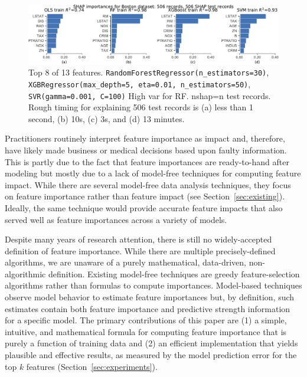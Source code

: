 \documentclass[twoside,11pt]{article}
\newcommand{\secref}[1]{Section~\ref{#1}}
\newcommand{\todo}[1]{{{\color{red}{[#1]}}}}
\begin{document}
\begin{figure}[htbp]
\begin{center}
\includegraphics[scale=0.6]{images/diff-models.pdf}
\caption{Top 8 of 13 features. {\tt\footnotesize RandomForestRegressor(n\_estimators=30)}, {\tt\footnotesize XGBRegressor(max\_depth=5, eta=0.01, n\_estimators=50)}, {\tt\footnotesize SVR(gamma=0.001, C=100)} High var for RF. nshap=n test records. Rough timing for explaining 506 test records is (a) less than 1 second, (b) 10s, (c) 3s, and (d) 13 minutes.}
\label{fig:diff-models}
\end{center}
\end{figure}

Practitioners routinely interpret feature importance as impact and, therefore, have likely made business or medical decisions based upon faulty information.  This is partly due to the fact that feature importances are ready-to-hand after modeling but mostly due to a lack of model-free techniques for computing feature impact. While there are several model-free data analysis techniques, they focus on feature importance rather than feature impact (see \secref{sec:existing}). Ideally, the same technique would provide accurate feature impacts that also served well as feature importances across a variety of models.

\todo{are we defining feature impact or importance?}

Despite many years of research attention, there is still no widely-accepted definition of feature importance. While there are multiple precisely-defined algorithms, we are unaware of a purely mathematical, data-driven, non-algorithmic definition.  Existing model-free techniques are greedy feature-selection algorithms rather than formulas to compute importances. Model-based techniques observe model behavior to estimate feature importances but, by definition, such estimates contain both feature importance and predictive strength information for a specific model.  The primary contributions of this paper are (1) a simple, intuitive, and mathematical formula for computing feature importance that is purely a function of training data and (2) an efficient implementation that yields plausible and effective results, as measured by the model prediction error for the top $k$ features (\secref{sec:experiments}). \todo{probably need to say regression versus classifier here.}
\end{document}
